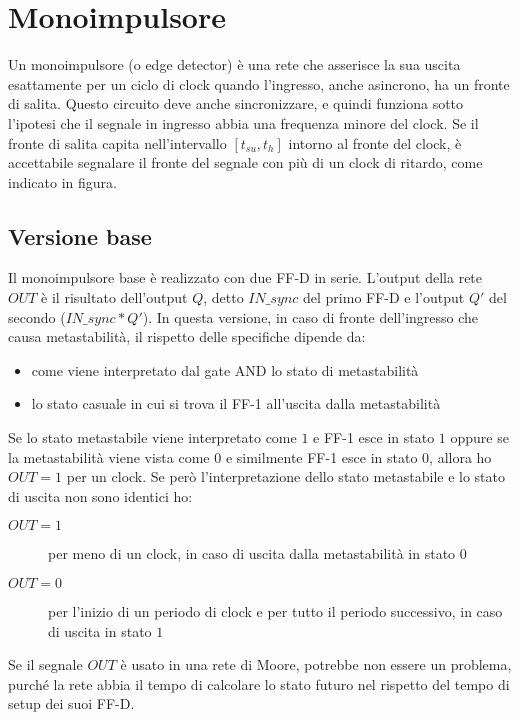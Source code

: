 \documentclass{subfiles}
\begin{document}
\section{Monoimpulsore}

Un monoimpulsore (o edge detector) è una rete che asserisce la sua uscita esattamente per un ciclo di clock quando l'ingresso, anche asincrono, ha un fronte di salita.
Questo circuito deve anche sincronizzare, e quindi funziona sotto l'ipotesi che il segnale in ingresso abbia una frequenza minore del clock.
Se il fronte di salita capita nell'intervallo $[t_{su}, t_h]$ intorno al fronte del clock, è accettabile segnalare il fronte del segnale con più di un clock di ritardo, come indicato in figura.

\subsection{Versione base}

Il monoimpulsore base è realizzato con due FF-D in serie.
L'output della rete $OUT$ è il risultato dell'output $Q$, detto $IN\_sync$ del primo FF-D e l'output $Q'$ del secondo ($IN\_sync * Q'$).
In questa versione, in caso di fronte dell'ingresso che causa metastabilità, il rispetto delle specifiche dipende da:

\begin{itemize}
    \item come viene interpretato dal gate AND lo stato di metastabilità
    \item lo stato casuale in cui si trova il FF-1 all'uscita dalla metastabilità
\end{itemize}

\noindent
Se lo stato metastabile viene interpretato come $1$ e FF-1 esce in stato $1$ oppure se la metastabilità viene vista come $0$ e similmente FF-1 esce in stato $0$, allora ho $OUT=1$ per un clock.
Se però l'interpretazione dello stato metastabile e lo stato di uscita non sono identici ho:

\begin{description}
\item[$OUT=1$] per meno di un clock, in caso di uscita dalla metastabilità in stato $0$
\item[$OUT=0$] per l'inizio di un periodo di clock e per tutto il periodo successivo, in caso di uscita in stato $1$
\end{description}

\noindent
Se il segnale $OUT$ è usato in una rete di Moore, potrebbe non essere un problema, purché la rete abbia il tempo di calcolare lo stato futuro nel rispetto del tempo di setup dei suoi FF-D.
\end{document}
